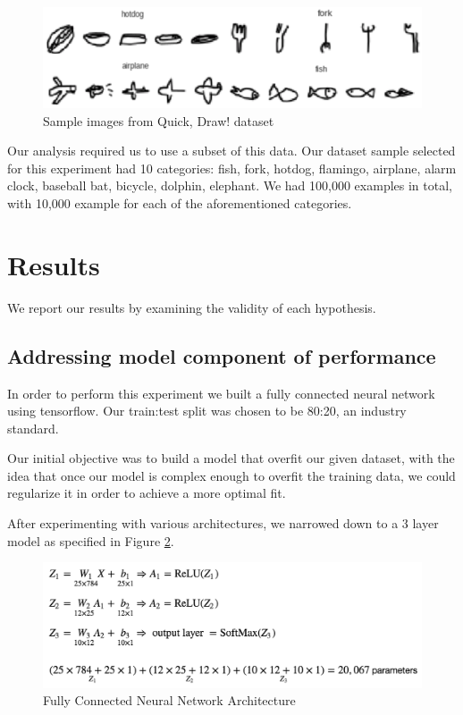 \documentclass[12pt]{article}
\begin{document}
\begin{figure}[h]
  \begin{center}
    \includegraphics[scale=0.5]{fig1}
  \end{center}
  \caption{Sample images from Quick, Draw! dataset}
  \label{fig:quickImages}
\end{figure}

Our analysis required us to use a subset of this data. Our dataset sample
selected for this experiment had 10 categories: fish, fork, hotdog, flamingo,
airplane, alarm clock, baseball bat, bicycle, dolphin, elephant. We had
100,000 examples in total, with 10,000 example for each of the aforementioned
categories.


\section{Results}

We report our results by examining the validity of each hypothesis.

\subsection{Addressing model component of performance}

In order to perform this experiment we built a fully connected neural network
using tensorflow. Our train:test split was chosen to be 80:20, an industry
standard. 

Our initial objective was to build a model that overfit our given dataset,
with the idea that once our model is complex enough to overfit the training
data, we could regularize it in order to achieve a more optimal fit.

After experimenting with various architectures, we narrowed down to a 3 layer
model as specified in Figure \ref{fig:fcnn}.

\begin{figure}[h]
  \begin{center}
    \includegraphics[scale=0.75]{fig2}
    \end{center}
  \caption{Fully Connected Neural Network Architecture}
  \label{fig:fcnn}
  \end{figure}
\end{document}
